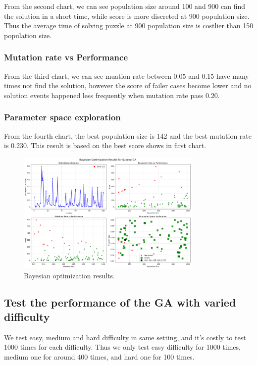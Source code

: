 From the second chart, we can see population size around 100 and 900 can find the solution in a short time, while score is more discreted at 900 population size. Thus the average time of solving puzzle at 900 population size is costlier than 150 population size.

\subsubsection{Mutation rate vs Performance}

From the third chart, we can see muation rate between 0.05 and 0.15 have many times not find the solution, however the score of failer cases become lower and no solution events happened less frequently when mutation rate pass 0.20.

\subsubsection{Parameter space exploration}

From the fourth chart, the best population size is 142 and the best mutation rate is 0.230. This result is based on the best score shows in first chart.

\begin{figure}[h]
\centering
\includegraphics[width=0.8\textwidth]{resources/bayesian_optimization_results.png}
\caption{Bayesian optimization results.}
\label{fig:bayesian_optimization_results}
\end{figure}

\subsection{Test the performance of the GA with varied difficulty}

We test easy, medium and hard difficulty in same setting, and it's costly to test 1000 times for each difficulty. Thus we only test easy difficulty for 1000 times, medium one for around 400 times, and hard one for 100 times.

